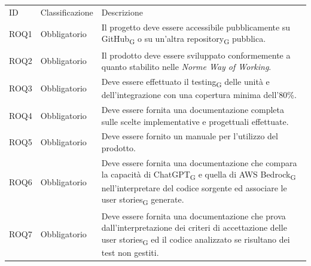\documentclass{article}
\begin{document}
\begin{center}
    \begin{tabular}{|p{3cm}|p{3cm}|p{6cm}|}
    \rowcolor{Blue} 
\hline
ID & Classificazione & Descrizione\\ 
\rowcolor{LightBlue}
\hline
ROQ1& Obbligatorio & Il progetto deve essere accessibile pubblicamente su GitHub\textsubscript{G} o su un'altra repository\textsubscript{G} pubblica.\\ 
\rowcolor{LighterBlue}
\hline
ROQ2& Obbligatorio & Il prodotto deve essere sviluppato conformemente a quanto stabilito nelle \textit{Norme Way of Working}. \\ 
\rowcolor{LightBlue}
\hline
ROQ3& Obbligatorio & Deve essere effettuato il testing\textsubscript{G} delle unità e dell'integrazione con una copertura minima dell'80\%.\\
\hline
\rowcolor{LighterBlue}

ROQ4& Obbligatorio & Deve essere fornita una documentazione completa sulle scelte implementative e progettuali effettuate.\\
\hline
\rowcolor{LightBlue}
ROQ5& Obbligatorio & Deve essere fornito un manuale per l'utilizzo del prodotto.\\
\hline
\rowcolor{LighterBlue}
ROQ6& Obbligatorio & Deve essere fornita una documentazione che compara la capacità di ChatGPT\textsubscript{G} e quella di AWS Bedrock\textsubscript{G} nell'interpretare del codice sorgente ed associare le user stories\textsubscript{G} generate.\\
\hline
\rowcolor{LightBlue}
ROQ7& Obbligatorio & Deve essere fornita una documentazione che prova dall'interpretazione dei criteri di accettazione delle user stories\textsubscript{G} ed il codice analizzato se risultano dei test non gestiti.\\
\hline
\end{tabular}
\label{tab:reqal}
\end{center}
\newpage
\end{document}
